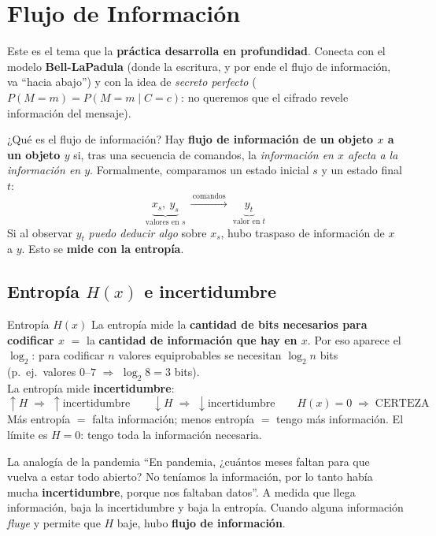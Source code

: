\documentclass[11pt,a4paper]{article}
\begin{document}
\section{Flujo de Información}

Este es el tema que la \textbf{práctica desarrolla en profundidad}. Conecta con el modelo
\textbf{Bell-LaPadula} (donde la escritura, y por ende el flujo de información, va ``hacia
abajo'') y con la idea de \emph{secreto perfecto} ($P(M{=}m)=P(M{=}m\mid C{=}c)$: no queremos
que el cifrado revele información del mensaje).

\begin{defbox}{¿Qué es el flujo de información?}
Hay \textbf{flujo de información de un objeto $x$ a un objeto $y$} si, tras una secuencia de
comandos, la \emph{información en $x$ afecta a la información en $y$}. Formalmente, comparamos
un estado inicial $s$ y un estado final $t$:
\[
\underbrace{x_s,\ y_s}_{\text{valores en } s}
\ \xrightarrow{\ \text{comandos}\ }\
\underbrace{y_t}_{\text{valor en } t}
\]
Si al observar $y_t$ \emph{puedo deducir algo} sobre $x_s$, hubo traspaso de información de $x$
a $y$. Esto se \textbf{mide con la entropía}.
\end{defbox}

\subsection{Entropía $H(x)$ e incertidumbre}

\begin{defbox}{Entropía $H(x)$}
La entropía mide la \textbf{cantidad de bits necesarios para codificar $x$} $=$ la
\textbf{cantidad de información que hay en $x$}. Por eso aparece el $\log_2$: para codificar
$n$ valores equiprobables se necesitan $\log_2 n$ bits (p.\ ej.\ valores $0$--$7$ $\Rightarrow$
$\log_2 8 = 3$ bits).\\[4pt]
La entropía mide \textbf{incertidumbre}:
\[
\uparrow H \;\Rightarrow\; \uparrow \text{incertidumbre} \qquad
\downarrow H \;\Rightarrow\; \downarrow \text{incertidumbre} \qquad
\boxed{H(x)=0 \;\Rightarrow\; \text{CERTEZA}}
\]
Más entropía $=$ falta información; menos entropía $=$ tengo más información. El límite es
$H=0$: tengo toda la información necesaria.
\end{defbox}

\begin{practbox}{La analogía de la pandemia}
``En pandemia, ¿cuántos meses faltan para que vuelva a estar todo abierto? No teníamos la
información, por lo tanto había mucha \textbf{incertidumbre}, porque nos faltaban datos''. A
medida que llega información, baja la incertidumbre y baja la entropía. Cuando alguna
información \emph{fluye} y permite que $H$ baje, hubo \textbf{flujo de información}.
\end{practbox}
\end{document}
